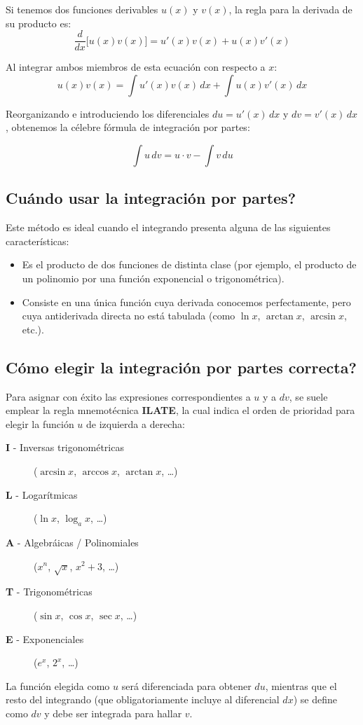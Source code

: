 \documentclass[12pt, letterpaper]{article}
\newcommand{\dx}{\,dx}
\newcommand{\du}{\,du}
\newcommand{\dv}{\,dv}
\begin{document}
Si tenemos dos funciones derivables $u(x)$ y $v(x)$, la regla para la derivada de su producto es:
$$\frac{d}{dx} \big[ u(x)v(x) \big] = u'(x)v(x) + u(x)v'(x)$$

Al integrar ambos miembros de esta ecuación con respecto a $x$:
$$u(x)v(x) = \int u'(x)v(x) \dx + \int u(x)v'(x) \dx$$

Reorganizando e introduciendo los diferenciales $du = u'(x)\dx$ y $dv = v'(x)\dx$, obtenemos la célebre fórmula de integración por partes:
\begin{cuadroadvertencia}
$$\int u \dv = u \cdot v - \int v \du$$
\end{cuadroadvertencia}

\subsection{\textquestiondown Cuándo usar la integración por partes?}
Este método es ideal cuando el integrando presenta alguna de las siguientes características:
\begin{itemize}
  \item Es el producto de dos funciones de distinta clase (por ejemplo, el producto de un polinomio por una función exponencial o trigonométrica).
  \item Consiste en una única función cuya derivada conocemos perfectamente, pero cuya antiderivada directa no está tabulada (como $\ln x$, $\arctan x$, $\arcsin x$, etc.).
\end{itemize}

\subsection{\textquestiondown Cómo elegir la integración por partes correcta?}
Para asignar con éxito las expresiones correspondientes a $u$ y a $dv$, se suele emplear la regla mnemotécnica \textbf{ILATE}, la cual indica el orden de prioridad para elegir la función $u$ de izquierda a derecha:
\begin{cuadroinfo}
\begin{description}
  \item[\textbf{I} - Inversas trigonométricas] ($\arcsin x$, $\arccos x$, $\arctan x$, \dots)
  \item[\textbf{L} - Logarítmicas] ($\ln x$, $\log_a x$, \dots)
  \item[\textbf{A} - Algebráicas / Polinomiales] ($x^n$, $\sqrt{x}$, $x^2 + 3$, \dots)
  \item[\textbf{T} - Trigonométricas] ($\sin x$, $\cos x$, $\sec x$, \dots)
  \item[\textbf{E} - Exponenciales] ($e^x$, $2^x$, \dots)
\end{description}
\end{cuadroinfo}
La función elegida como $u$ será diferenciada para obtener $du$, mientras que el resto del integrando (que obligatoriamente incluye al diferencial $dx$) se define como $dv$ y debe ser integrada para hallar $v$.
\end{document}
